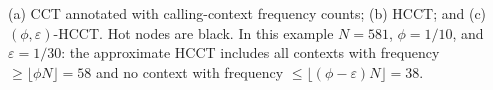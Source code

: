 \label{fig:hcct-example} (a) CCT annotated with calling-context frequency counts; (b) HCCT; and (c) $(\phi,\varepsilon)$-HCCT. Hot nodes are black. In this example $N=581$, $\phi=1/10$, and $\varepsilon=1/30$: the approximate HCCT includes all contexts with frequency $\ge\lfloor\phi N\rfloor=58$  and no context with frequency $\le\lfloor(\phi-\varepsilon) N\rfloor=38$.
